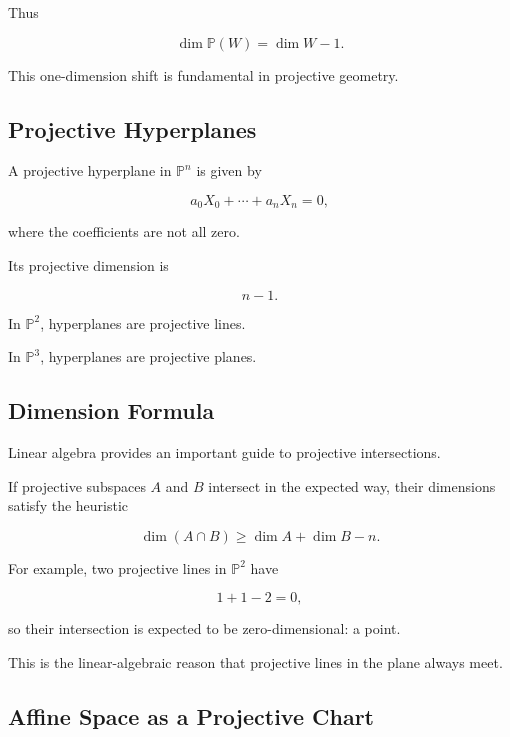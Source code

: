 Thus

\[
\boxed{
\dim\mathbb{P}(W)=\dim W-1.
}
\]

This one-dimension shift is fundamental in projective geometry.

\subsection{Projective Hyperplanes}
\label{subsec:projective-hyperplanes}

A projective hyperplane in \(\mathbb{P}^{n}\) is given by

\[
\boxed{
a_0X_0+\cdots+a_nX_n=0,
}
\]

where the coefficients are not all zero.

Its projective dimension is

\[
n-1.
\]

In \(\mathbb{P}^{2}\), hyperplanes are projective lines.

In \(\mathbb{P}^{3}\), hyperplanes are projective planes.

\subsection{Dimension Formula}
\label{subsec:projective-dimension-formula}

Linear algebra provides an important guide to projective intersections.

If projective subspaces \(A\) and \(B\) intersect in the expected way, their
dimensions satisfy the heuristic

\[
\boxed{
\dim(A\cap B)
\geq
\dim A+\dim B-n.
}
\]

For example, two projective lines in \(\mathbb{P}^{2}\) have

\[
1+1-2=0,
\]

so their intersection is expected to be zero-dimensional: a point.

This is the linear-algebraic reason that projective lines in the plane always
meet.

\subsection{Affine Space as a Projective Chart}
\label{subsec:affine-space-projective-chart}

